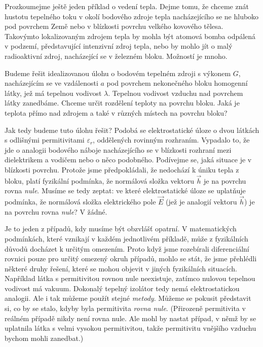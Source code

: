     Prozkoumejme ještě jeden příklad o vedení tepla. Dejme tomu, že chceme znát hustotu tepelného
    toku v okolí bodového zdroje tepla nacházejícího se ne hluboko pod povrchem Země nebo v
    blízkosti povrchu velkého kovového tělesa. Takovýmto lokalizovaným zdrojem tepla by mohla být
    atomová bomba odpálená v podzemí, představující intenzivní zdroj tepla, nebo by mohlo jít o malý
    radioaktivní zdroj, nacházející se v železném bloku. Možností je mnoho.

    Budeme řešit idealizovanou úlohu o bodovém tepelném zdroji s výkonem \(G\), nacházejícím se ve
    vzdálenosti \(a\) pod povrchem nekonečného bloku homogenní látky, jež má tepelnou vodivost
    \(\lambda\). Tepelnou vodivost vzduchu nad povrchem látky zanedbáme. Chceme určit rozdělení
    teploty na povrchu bloku. Jaká je teplota přímo nad zdrojem a také v různých místech na povrchu
    bloku?

    Jak tedy budeme tuto úlohu řešit? Podobá se elektrostatické úloze o dvou látkách s odlišnými
    permitivitami \(\varepsilon_r\), oddělených rovinným rozhraním. Vypadalo to, že jde o analogii
    bodového náboje nacházejícího se v blízkosti rozhraní mezi dielektrikem a vodičem nebo o něco
    podobného. Podívejme se, jaká situace je v blízkosti povrchu. Protože jsme předpokládali, že
    nedochází k úniku tepla z bloku, platí fyzikální podmínka, že normálová složka vektoru
    \(\vec{h}\) je na povrchu rovna \emph{nule}. Musíme se tedy zeptat: ve které elektrostatické
    úloze se uplatňuje podmínka, že normálová složka elektrického pole \(\vec{E}\) (jež je analogií
    vektoru \(\vec{h}\)) je na povrchu rovna \emph{nule}? V žádné.

    Je to jeden z případů, kdy musíme být obzvlášť opatrní. V matematických podmínkách, které
    vznikají v každém jednotlivém příkladě, může z fyzikálních důvodů docházet k určitým omezením.
    Proto když jsme rozebírali diferenciální rovnici pouze pro určitý omezený okruh případů, mohlo
    se stát, že jsme přehlédli některé druhy řešení, které se mohou objevit v jiných fyzikálních
    situacích. Například látka s permitivitou rovnou nule neexistuje, zatímco nulovou tepelnou
    vodivost má vakuum. Dokonalý tepelný izolátor tedy nemá elektrostatickou analogii. Ale i tak
    můžeme použít stejné \emph{metody}. Můžeme se pokusit představit si, co by se stalo, kdyby byla
    permitivita \emph{rovna nule}. (Přirozeně permitivita v reálném případě nikdy není rovna nule.
    Ale mohl by nastat případ, v němž by se uplatnila látka s velmi vysokou permitivitou, takže
    permitivitu vnějšího vzduchu bychom mohli zanedbat.)

